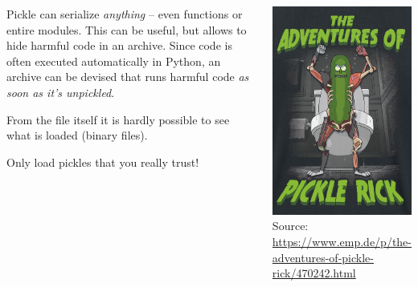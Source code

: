 \begin{frame}
%
\begin{columns}[T]
\begin{warnbox}
Pickle can serialize \emph{anything} -- even functions or entire modules. This can be useful, but allows to hide harmful code in an archive. Since code is often executed automatically in Python, an archive can be devised that runs harmful code \emph{as soon as it's unpickled}.

From the file itself it is hardly possible to see what is loaded (binary files).

Only load pickles that you really trust!
\end{warnbox}
%
\begin{center}
\includegraphics[width=.6\linewidth]{./gfx/pickleRick}\\
\scriptsize Source: \url{https://www.emp.de/p/the-adventures-of-pickle-rick/470242.html}
\end{center}
\end{columns}
%
\end{frame}


